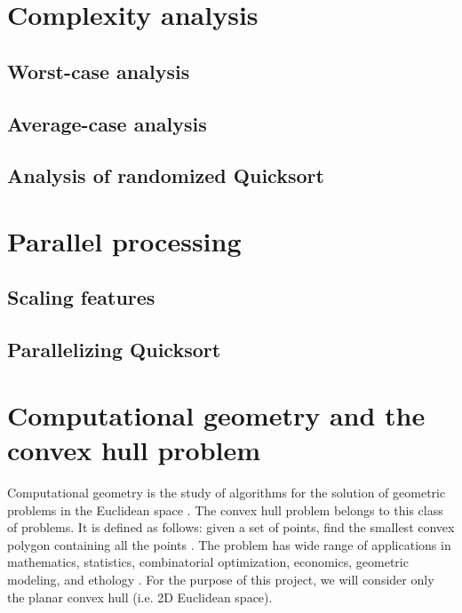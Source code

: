 \documentclass[]{finalproject}
\begin{document}
 


\section{Complexity analysis}
\subsection{Worst-case analysis}
\subsection{Average-case analysis}
\subsection{Analysis of randomized Quicksort}

\section{Parallel processing}
\subsection{Scaling features}
\subsection{Parallelizing Quicksort}

\section{Computational geometry and the convex hull problem}
Computational geometry is the study of algorithms for the solution of geometric problems in the Euclidean space \cite{paper}.
The convex hull problem belongs to this class of problems. It is defined as follows:
given a set of points, find the smallest convex polygon containing all the points \cite{geowiki}.
The problem has wide range of applications in
mathematics, statistics, combinatorial optimization, economics, geometric modeling, and ethology \cite{chwiki}.
For the purpose of this project, we will consider only the planar convex hull (i.e. 2D Euclidean space).
\end{document}
